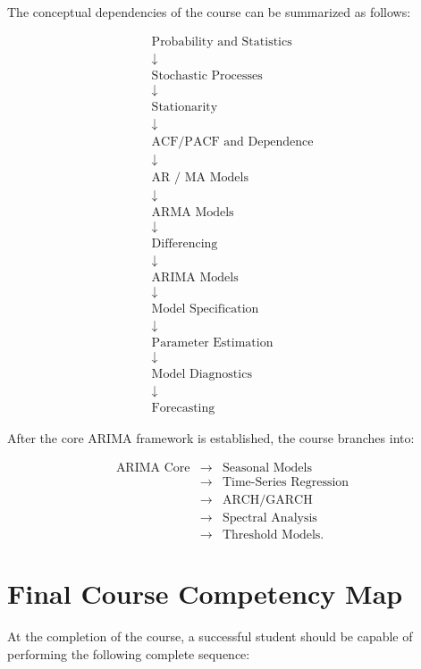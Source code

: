 \documentclass[11pt,a4paper]{article}
\begin{document}
The conceptual dependencies of the course can be summarized as follows:

\[
\begin{array}{c}
\text{Probability and Statistics}\\
\downarrow\\
\text{Stochastic Processes}\\
\downarrow\\
\text{Stationarity}\\
\downarrow\\
\text{ACF/PACF and Dependence}\\
\downarrow\\
\text{AR / MA Models}\\
\downarrow\\
\text{ARMA Models}\\
\downarrow\\
\text{Differencing}\\
\downarrow\\
\text{ARIMA Models}\\
\downarrow\\
\text{Model Specification}\\
\downarrow\\
\text{Parameter Estimation}\\
\downarrow\\
\text{Model Diagnostics}\\
\downarrow\\
\text{Forecasting}
\end{array}
\]

After the core ARIMA framework is established, the course branches into:

\[
\begin{array}{ccc}
\text{ARIMA Core}
&\longrightarrow&
\text{Seasonal Models}\\
&\longrightarrow&
\text{Time-Series Regression}\\
&\longrightarrow&
\text{ARCH/GARCH}\\
&\longrightarrow&
\text{Spectral Analysis}\\
&\longrightarrow&
\text{Threshold Models}.
\end{array}
\]

\section{Final Course Competency Map}

At the completion of the course, a successful student should be capable of
performing the following complete sequence:
\end{document}
